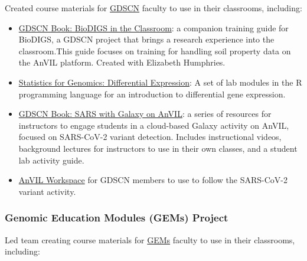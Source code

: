 \documentclass{cv}
\begin{document}
Created course materials for \href{https://www.gdscn.org/}{GDSCN} faculty to use in their classrooms, including: 

\begin{itemize}

\item \href{https://hutchdatascience.org/GDSCN_BioDIGS_Book/}{GDSCN Book: BioDIGS in the Classroom}: a companion training guide for BioDIGS, a GDSCN project that brings a research experience into the classroom.This guide focuses on training for handling soil property data on the AnVIL platform. Created with Elizabeth Humphries.

\item \href{https://jhudatascience.org/GDSCN_Book_Statistics_for_Genomics_Differential_Expression/}{Statistics for Genomics: Differential Expression}: A set of lab modules in the R programming language for an introduction to differential gene expression.

\item \href{https://jhudatascience.org/GDSCN_Book_SARS_Galaxy_on_AnVIL/}{GDSCN Book: SARS with Galaxy on AnVIL}: a series of resources for instructors to engage students in a cloud-based Galaxy activity on AnVIL, focused on SARS-CoV-2 variant detection. Includes instructional videos, background lectures for instructors to use in their own classes, and a student lab activity guide.

\item \href{https://anvil.terra.bio/#workspaces/gdscn-exercises/SARS-CoV-2-Genome}{AnVIL Workspace} for GDSCN members to use to follow the SARS-CoV-2 variant activity.

\end{itemize}

\subsubsection*{Genomic Education Modules (GEMs) Project}

Led team creating course materials for \href{https://www.genomicseducation.org/}{GEMs} faculty to use in their classrooms, including: 
\end{document}
